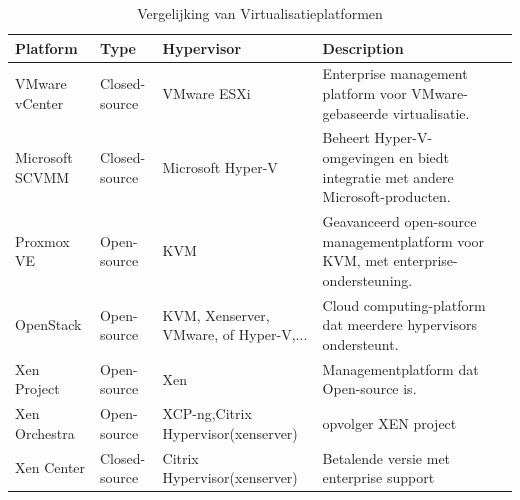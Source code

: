     \begin{table}[h!]
        \centering
        \small
        \begin{tabular}{|p{2cm}|p{2cm}|p{3cm}|p{7cm}|p{7cm}|}
        \hline
        \textbf{Platform}      & \textbf{Type}      & \textbf{Hypervisor} & \textbf{Description} \\ \hline
        VMware vCenter         & Closed-source      & VMware ESXi         & Enterprise management platform voor VMware-gebaseerde virtualisatie. \\ \hline
        Microsoft SCVMM        & Closed-source      & Microsoft Hyper-V   & Beheert Hyper-V-omgevingen en biedt integratie met andere Microsoft-producten. \\ \hline
        Proxmox VE             & Open-source        & KVM                 & Geavanceerd open-source managementplatform voor KVM, met enterprise-ondersteuning. \\ \hline
        OpenStack              & Open-source        & KVM, Xenserver, VMware, of Hyper-V,...  & Cloud computing-platform dat meerdere hypervisors ondersteunt. \\ \hline
        Xen Project            & Open-source        & Xen                 & Managementplatform dat Open-source is. \\ \hline
        Xen Orchestra  & Open-source & XCP-ng,Citrix Hypervisor(xenserver)  & opvolger XEN project \\ \hline
        Xen Center  & Closed-source & Citrix Hypervisor(xenserver)   &  Betalende versie met enterprise support\\ 
        \end{tabular}
        \caption{Vergelijking van Virtualisatieplatformen}
        \label{tab:longlist}        
        \end{table}
\clearpage        
